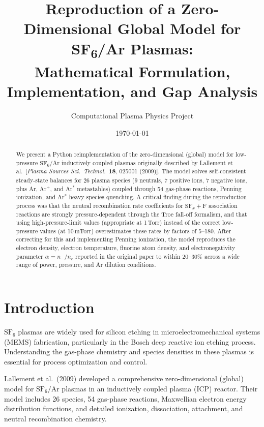 \documentclass[11pt,a4paper]{article}
\title{Reproduction of a Zero-Dimensional Global Model for SF\textsubscript{6}/Ar Plasmas:\\Mathematical Formulation, Implementation, and Gap Analysis}
\author{Computational Plasma Physics Project}
\date{\today}
\newcommand{\SFx}{\mathrm{SF}_x}
\newcommand{\SFsix}{\mathrm{SF}_6}
\newcommand{\Ar}{\mathrm{Ar}}
\newcommand{\ne}{n_e}
\begin{document}
\maketitle

\begin{abstract}
We present a Python reimplementation of the zero-dimensional (global) model for low-pressure $\SFsix/\Ar$ inductively coupled plasmas originally described by Lallement et al.\ [\textit{Plasma Sources Sci.\ Technol.}\ \textbf{18}, 025001 (2009)].  The model solves self-consistent steady-state balances for 26 plasma species (9 neutrals, 7 positive ions, 7 negative ions, plus Ar, Ar$^+$, and Ar$^*$ metastables) coupled through 54 gas-phase reactions, Penning ionization, and Ar$^*$ heavy-species quenching.  A critical finding during the reproduction process was that the neutral recombination rate coefficients for $\SFx + \mathrm{F}$ association reactions are strongly pressure-dependent through the Troe fall-off formalism, and that using high-pressure-limit values (appropriate at 1\,Torr) instead of the correct low-pressure values (at 10\,mTorr) overestimates these rates by factors of 5--180.  After correcting for this and implementing Penning ionization, the model reproduces the electron density, electron temperature, fluorine atom density, and electronegativity parameter $\alpha = n_-/\ne$ reported in the original paper to within 20--30\% across a wide range of power, pressure, and Ar dilution conditions.
\end{abstract}

\tableofcontents
\newpage

\section{Introduction}

$\SFsix$ plasmas are widely used for silicon etching in microelectromechanical systems (MEMS) fabrication, particularly in the Bosch deep reactive ion etching process.  Understanding the gas-phase chemistry and species densities in these plasmas is essential for process optimization and control.

Lallement et al.\ (2009) developed a comprehensive zero-dimensional (global) model for $\SFsix/\Ar$ plasmas in an inductively coupled plasma (ICP) reactor.  Their model includes 26 species, 54 gas-phase reactions, Maxwellian electron energy distribution functions, and detailed ionization, dissociation, attachment, and neutral recombination chemistry.
\end{document}
